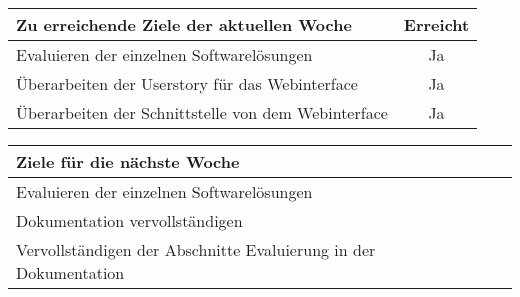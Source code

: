 \begin{tabularx}{\textwidth}{Xc}
    \arrayrulecolor{OliveGreen}
    \toprule
    {\bfseries Zu erreichende Ziele der aktuellen Woche} & {\bfseries Erreicht} \\
    \midrule[2pt]
    Evaluieren der einzelnen Softwarelösungen              &Ja               \\
    \rowcolor{OliveGreen!15}
    Überarbeiten der Userstory für das Webinterface        &Ja               \\
    \rowcolor{White}
    Überarbeiten der Schnittstelle von dem Webinterface    &Ja               \\
    \bottomrule[2pt]
\end{tabularx}
%
\vspace{1cm}
%
\begin{tabularx}{\textwidth}{Xc}
    \arrayrulecolor{OliveGreen}
    \toprule
    {\bfseries Ziele für die nächste Woche}        &                         \\
    \midrule[2pt]
    Evaluieren der einzelnen Softwarelösungen      &                         \\
    \rowcolor{OliveGreen!15}
    Dokumentation vervollständigen                 &                         \\
    \rowcolor{White}
    Vervollständigen der Abschnitte Evaluierung in der Dokumentation &       \\
\end{tabularx}
